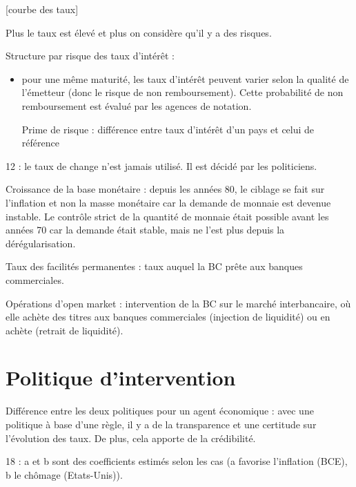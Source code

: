 [courbe des taux]

Plus le taux est élevé et plus on considère qu'il y a des risques.

Structure par risque des taux d'intérêt :

\begin{itemize}
	\item pour une même maturité, les taux d'intérêt peuvent varier selon la qualité de l'émetteur (donc le risque de non remboursement). Cette probabilité de non remboursement est évalué par les agences de notation.
	
	Prime de risque : différence entre taux d'intérêt d'un pays et celui de référence
\end{itemize}

12 : le taux de change n'est jamais utilisé. Il est décidé par les politiciens.

Croissance de la base monétaire : depuis les années 80, le ciblage se fait sur l'inflation et non la masse monétaire car la demande de monnaie est devenue instable. Le contrôle strict de la quantité de monnaie était possible avant les années 70 car la demande était stable, mais ne l'est plus depuis la dérégularisation.

Taux des facilités permanentes : taux auquel la BC prête aux banques commerciales.

Opérations d'open market : intervention de la BC sur le marché interbancaire, où elle achète des titres aux banques commerciales (injection de liquidité) ou en achète (retrait de liquidité).

\section{Politique d'intervention}

Différence entre les deux politiques pour un agent économique : avec une politique à base d'une règle, il y a de la transparence et une certitude sur l'évolution des taux. De plus, cela apporte de la crédibilité.

18 : a et b sont des coefficients estimés selon les cas (a favorise l'inflation (BCE), b le chômage (Etats-Unis)).